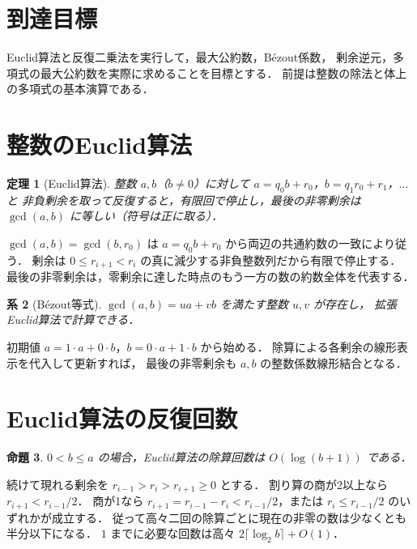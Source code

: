 \documentclass[a5paper,10pt,onecolumn]{jsarticle}
\makeatletter
\theoremstyle{mathnotetheorem}
\newtheorem{theorem}{定理}[section]
\newtheorem{proposition}[theorem]{命題}
\newtheorem{corollary}[theorem]{系}
\renewcommand{\proofname}{証明}
\renewenvironment{proof}[1][\proofname]{%
  \par\pushQED{\qed}\normalfont\topsep4\p@\@plus2\p@\relax
  \trivlist\item[\hskip\labelsep\bfseries #1]\ignorespaces
}{\popQED\endtrivlist\@endpefalse}
\makeatother
\begin{document}
\section*{到達目標}
Euclid算法と反復二乗法を実行して，最大公約数，B\'ezout係数，
剰余逆元，多項式の最大公約数を実際に求めることを目標とする．
前提は整数の除法と体上の多項式の基本演算である．

\section{整数のEuclid算法}
\begin{theorem}[Euclid算法]
整数 $a,b$（$b\ne0$）に対して
$a=q_0b+r_0$，$b=q_1r_0+r_1$，$\ldots$ と
非負剰余を取って反復すると，有限回で停止し，最後の非零剰余は
$\gcd(a,b)$ に等しい（符号は正に取る）．
\end{theorem}
\begin{proof}
$\gcd(a,b)=\gcd(b,r_0)$ は
$a=q_0b+r_0$ から両辺の共通約数の一致により従う．
剰余は $0\le r_{i+1}<r_i$ の真に減少する非負整数列だから有限で停止する．
最後の非零剰余は，零剰余に達した時点のもう一方の数の約数全体を代表する．
\end{proof}
\begin{corollary}[B\'ezout等式]
$\gcd(a,b)=ua+vb$ を満たす整数 $u,v$ が存在し，
拡張Euclid算法で計算できる．
\end{corollary}
\begin{proof}
初期値 $a=1\cdot a+0\cdot b$，$b=0\cdot a+1\cdot b$ から始める．
除算による各剰余の線形表示を代入して更新すれば，
最後の非零剰余も $a,b$ の整数係数線形結合となる．
\end{proof}
\section{Euclid算法の反復回数}
\begin{proposition}
$0<b\le a$ の場合，Euclid算法の除算回数は $O(\log(b+1))$ である．
\end{proposition}
\begin{proof}
続けて現れる剰余を $r_{i-1}>r_i>r_{i+1}\ge0$ とする．
割り算の商が2以上なら $r_{i+1}<r_{i-1}/2$．
商が1なら $r_{i+1}=r_{i-1}-r_i<r_{i-1}/2$，または
$r_i\le r_{i-1}/2$ のいずれかが成立する．
従って高々二回の除算ごとに現在の非零の数は少なくとも半分以下になる．
$1$ までに必要な回数は高々 $2\lceil\log_2 b\rceil+O(1)$．
\end{proof}
\end{document}
